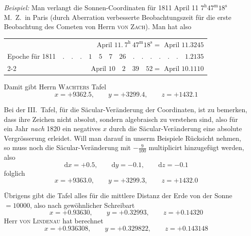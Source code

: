 \emph{Beispiel:} Man verlangt die Sonnen-Coordinaten für 1811 April 11 $7^{\mathrm h}47^{\mathrm m}18^{\mathrm s}$ M.\ Z.\ in Paris (durch Aberration verbesserte Beobachtungszeit für die erste Beobachtung des Cometen von Herrn \textsc{von Zach}). Man hat also
\begin{center}
\begin{tabular}{lr}
& April $11.\ 7^{\mathrm h}\ 47^{\mathrm m}18^{\mathrm s}=$ April $11.3245$\\
Epoche für 1811 & $.\quad.\quad.\quad1\quad5\quad7\quad26\quad.\quad.\quad.\quad.\quad.\quad.\quad1.2135$\\\cline{2-2}
& April $10\quad2\quad39\quad52=$ April $10.1110$
\end{tabular}
\end{center}
Damit gibt Herrn \textsc{Wachters} Tafel
\[
x=+9362.5,\qquad y=+3299.4,\qquad z=+1432.1
\]

Bei der III.\ Tafel, für die Säcular-Veränderung der Coordinaten, ist zu bemerken, dass ihre Zeichen nicht absolut, sondern algebraisch zu verstehen sind, also für ein Jahr \emph{nach} 1820 ein negatives $x$ durch die Säcular-Veränderung eine absolute Vergrösserung erleidet. Will man darauf in unserm Beispiele Rücksicht nehmen, so muss noch die Säcular-Veränderung mit $-\frac9{100}$ multiplicirt hinzugefügt werden, also
\[
\mathrm dx=+0.5,\qquad\mathrm dy=-0.1,\qquad\mathrm dz=-0.1
\]
folglich
\[
x=+9363.0,\qquad y=+3299.3,\qquad z=+1432.0
\]
%

Übrigens gibt die Tafel alles für die mittlere Distanz der Erde von der Sonne $=10000$, also nach gewöhnlicher Schreibart
\[
x=+0.93630,\qquad y=+0.32993,\qquad z=+0.14320
\]
Herr \textsc{von Lindenau} hat berechnet
\[
x=+0.936308,\qquad y=+0.329822,\qquad z=+0.143148
\]

